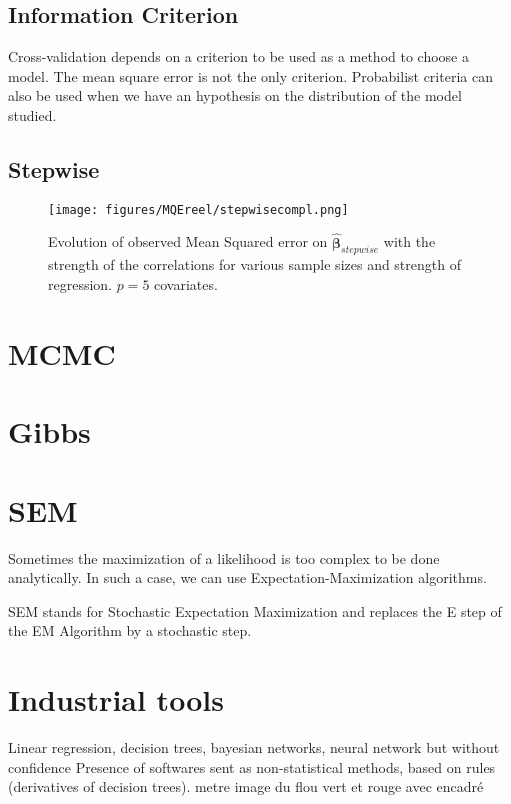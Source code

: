 \documentclass[12pt,a4paper]{report}
\begin{document}
			\subsection{Information Criterion}
			Cross-validation depends on a criterion to be used as a method to choose a model. The mean square error is not the only criterion. Probabilist criteria can also be used when we have an hypothesis on the distribution of the model studied.
			\cite{BIChuard}
			
			\subsection{Stepwise}
			\cite{seber2012linear,miller2002subset}
			
				 \begin{figure}
	 \centering
	  \texttt{[image: figures/MQEreel/stepwisecompl.png]}
	  \caption{Evolution of observed Mean Squared error on $\hat{\boldsymbol{\beta}}_{stepwise}$ with the strength of the correlations for various sample sizes and strength of regression. $p=5$ covariates. } \label{MQEstepwisecompl}
	\end{figure}
	
	
		
		\section{MCMC}
		\cite{gilks1996markov,chib1995understanding,roberts2001optimal}
		\section{Gibbs}
		\cite{casella1992explaining}
		
		\section{SEM}
			Sometimes the maximization of a likelihood is too complex to be done analytically. In such a case, we can use Expectation-Maximization algorithms.
			
			SEM stands for Stochastic Expectation Maximization and replaces the E step of the EM Algorithm by a stochastic step.
			
		\section{Industrial tools}
			Linear regression, decision trees, bayesian networks, neural network but without confidence
			Presence of softwares sent as non-statistical methods, based on rules (derivatives of decision trees).			
			metre image du flou vert et rouge avec encadré
			
\end{document}
